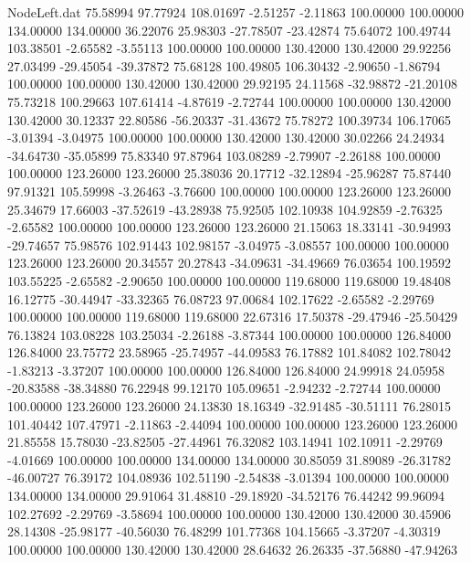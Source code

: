 \begin{filecontents}{NodeLeft.dat}
  75.58994   97.77924  108.01697    -2.51257   -2.11863  100.00000  100.00000  134.00000  134.00000   36.22076   25.98303  -27.78507  -23.42874
  75.64072  100.49744  103.38501    -2.65582   -3.55113  100.00000  100.00000  130.42000  130.42000   29.92256   27.03499  -29.45054  -39.37872
  75.68128  100.49805  106.30432    -2.90650   -1.86794  100.00000  100.00000  130.42000  130.42000   29.92195   24.11568  -32.98872  -21.20108
  75.73218  100.29663  107.61414    -4.87619   -2.72744  100.00000  100.00000  130.42000  130.42000   30.12337   22.80586  -56.20337  -31.43672
  75.78272  100.39734  106.17065    -3.01394   -3.04975  100.00000  100.00000  130.42000  130.42000   30.02266   24.24934  -34.64730  -35.05899
  75.83340   97.87964  103.08289    -2.79907   -2.26188  100.00000  100.00000  123.26000  123.26000   25.38036   20.17712  -32.12894  -25.96287
  75.87440   97.91321  105.59998    -3.26463   -3.76600  100.00000  100.00000  123.26000  123.26000   25.34679   17.66003  -37.52619  -43.28938
  75.92505  102.10938  104.92859    -2.76325   -2.65582  100.00000  100.00000  123.26000  123.26000   21.15063   18.33141  -30.94993  -29.74657
  75.98576  102.91443  102.98157    -3.04975   -3.08557  100.00000  100.00000  123.26000  123.26000   20.34557   20.27843  -34.09631  -34.49669
  76.03654  100.19592  103.55225    -2.65582   -2.90650  100.00000  100.00000  119.68000  119.68000   19.48408   16.12775  -30.44947  -33.32365
  76.08723   97.00684  102.17622    -2.65582   -2.29769  100.00000  100.00000  119.68000  119.68000   22.67316   17.50378  -29.47946  -25.50429
  76.13824  103.08228  103.25034    -2.26188   -3.87344  100.00000  100.00000  126.84000  126.84000   23.75772   23.58965  -25.74957  -44.09583
  76.17882  101.84082  102.78042    -1.83213   -3.37207  100.00000  100.00000  126.84000  126.84000   24.99918   24.05958  -20.83588  -38.34880
  76.22948   99.12170  105.09651    -2.94232   -2.72744  100.00000  100.00000  123.26000  123.26000   24.13830   18.16349  -32.91485  -30.51111
  76.28015  101.40442  107.47971    -2.11863   -2.44094  100.00000  100.00000  123.26000  123.26000   21.85558   15.78030  -23.82505  -27.44961
  76.32082  103.14941  102.10911    -2.29769   -4.01669  100.00000  100.00000  134.00000  134.00000   30.85059   31.89089  -26.31782  -46.00727
  76.39172  104.08936  102.51190    -2.54838   -3.01394  100.00000  100.00000  134.00000  134.00000   29.91064   31.48810  -29.18920  -34.52176
  76.44242   99.96094  102.27692    -2.29769   -3.58694  100.00000  100.00000  130.42000  130.42000   30.45906   28.14308  -25.98177  -40.56030
  76.48299  101.77368  104.15665    -3.37207   -4.30319  100.00000  100.00000  130.42000  130.42000   28.64632   26.26335  -37.56880  -47.94263

\end{filecontents}

